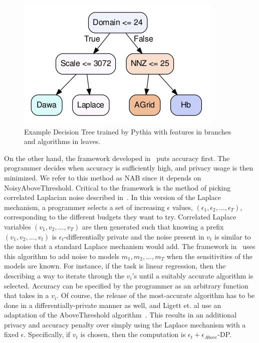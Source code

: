 \documentclass[11pt]{report}
\begin{document}
\begin{figure}
\begin{center}
\includegraphics[scale=0.5]{PythiaDTree}
\end{center}
\caption{Example Decision Tree trained by Pythia with features in branches and algorithms in leaves.}\label{fig:pythia}
\end{figure}
On the other hand, the framework developed in~\cite{Ligett:2017} puts accuracy first. The programmer decides when accuracy is sufficiently high, and privacy usage is then minimized. We refer to this method as NAB since it depends on NoisyAboveThreshold. Critical to the framework is the method of picking correlated Laplacian noise described in~\cite{Koufogiannis:2015}. In this version of the Laplace mechanism, a programmer selects a set of increasing $\epsilon$ values, $(\epsilon_1, \epsilon_2, \ldots, \epsilon_T)$, corresponding to the different budgets they want to try. Correlated Laplace variables $(v_1, v_2, \ldots, v_T)$ are then generated such that knowing a prefix $(v_1, v_2, \ldots, v_t)$ is $\epsilon_t$-differentially private and the noise present in $v_t$ is similar to the noise that a standard Laplace mechanism would add. The framework in~\cite{Ligett:2017} uses this algorithm to add noise to models $m_1, m_2, \ldots, m_T$ when the sensitivities of the models are known. For instance, if the task is linear regression, then the describing a way to iterate through the $v_i$'s until a suitably accurate algorithm is selected. Accuracy can be specified by the programmer as an arbitrary function that takes in a $v_i$. Of course, the release of the most-accurate algorithm has to be done in a differentially-private manner as well, and Ligett et. al use an adaptation of the AboveThreshold algorithm~\cite{Dwork:2006}. This results in an additional privacy and accuracy penalty over simply using the Laplace mechanism with a fixed $\epsilon$. Specifically, if $v_t$ is chosen, then the computation is $\epsilon_t+\epsilon_{Above}$-DP.
\end{document}
